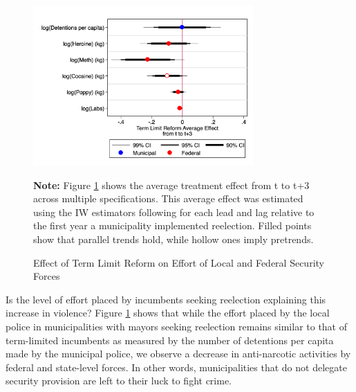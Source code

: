 \documentclass[12pt]{amsart}
\makeatletter
\def\section{\@startsection{section}{1}
	\z@{1.0\linespacing\@plus\linespacing}{.5\linespacing}{\Large}}
\numberwithin{equation}{section}
\theoremstyle{definition}
\theoremstyle{definition}
\theoremstyle{definition}
\makeatother
\begin{document}
\begin{figure}[H]  
\centering
\caption{Effect of Term Limit Reform on Effort of Local and Federal Security Forces} 
\label{fig:effort}

   
\includegraphics[width=0.75\textwidth]{../Figures/effort.png}
  
 \textbf{Note:} Figure \ref{fig:effort} shows the average treatment effect from t to t+3 across multiple specifications. This average effect was estimated using the IW estimators following \citet{abraham_sun_2020} for each lead and lag relative to the first year a municipality implemented reelection. Filled points show that parallel trends hold, while hollow ones imply pretrends.        
\end{figure} 


Is the level of effort placed by incumbents seeking reelection explaining this increase in violence? Figure \ref{fig:effort} shows that while the effort placed by the local police in municipalities with mayors seeking reelection remains similar to that of term-limited incumbents as measured by the number of detentions per capita made by the municipal police, we observe a decrease in anti-narcotic activities by federal and state-level forces. In other words, municipalities that do not delegate security provision are left to their luck to fight crime. 


 
\section{Conclusion \label{sec:conclusion}}
\end{document}
